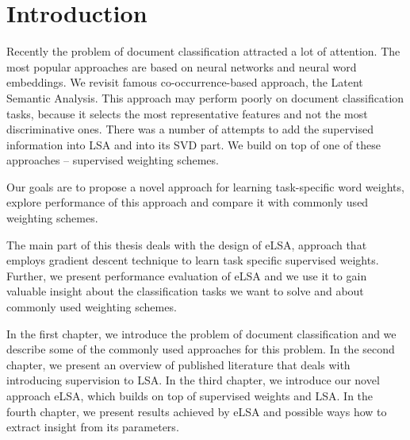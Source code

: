 \chapter*{Introduction}

Recently the problem of document classification attracted a lot of attention. 
The most popular approaches are based on neural networks and neural word embeddings.
We revisit famous co-occurrence-based approach, the Latent Semantic Analysis.
This approach may perform poorly on document classification tasks, because it selects the most representative features and not the most discriminative ones. 
There was a number of attempts to add the supervised information into LSA and into its SVD part.
We build on top of one of these approaches -- supervised weighting schemes.

\bigskip
Our goals are to propose a novel approach for learning task-specific word weights, explore performance of this approach and compare it with commonly used weighting schemes.
\bigskip

The main part of this thesis deals with the design of eLSA, approach that employs gradient descent technique to learn task specific supervised weights.
Further, we present performance evaluation of eLSA and we use it to gain valuable insight about the classification tasks we want to solve and about commonly used weighting schemes.

\bigskip

In the first chapter, we introduce the problem of document classification and we describe some of the commonly used approaches for this problem.
In the second chapter, we present an overview of published literature that deals with introducing supervision to LSA.
In the third chapter, we introduce our novel approach eLSA, which builds on top of supervised weights and LSA.
In the fourth chapter, we present results achieved by eLSA and possible ways how to extract insight from its parameters. 



